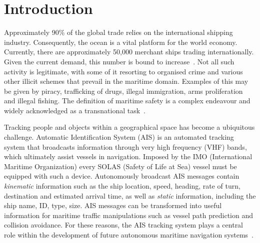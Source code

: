 \chapter{Introduction}
\label{chapter:introduction}


Approximately 90\% of the global trade relies on the international shipping industry. Consequently, the ocean is a vital platform for the world economy.
Currently, there are approximately 50,000 merchant ships trading internationally. Given the current demand, this number is bound to increase~\cite{ICS}. Not all such activity is legitimate, with some of it resorting to organised crime and various other illicit schemes that prevail in the maritime domain. Examples of this may be given by piracy, trafficking of drugs, illegal immigration, arms proliferation and illegal fishing. The definition of maritime safety is a complex endeavour and widely acknowledged as a transnational task~\cite{Bueger2015}.

Tracking people and objects within a geographical space has become a ubiquitous challenge. Automatic Identification System (AIS)\label{label_AIS} is an automated tracking system that broadcasts information through very high frequency (VHF) bands, which ultimately assist vessels in navigation. Imposed by the IMO (International Maritime Organization)\label{label_IMO} every SOLAS
(Safety of Life at Sea) \label{label_SOLAS} vessel must be equipped with such a device.
Autonomously broadcast AIS messages contain \emph{kinematic} information such as the ship location, speed, heading, rate of turn, destination and estimated arrival time, as well as \emph{static} information, including the ship name, ID, type, size. AIS messages can be transformed into useful information for maritime traffic manipulations such as vessel path prediction and collision avoidance. For these reasons, the AIS tracking system plays a central role within the development of future autonomous maritime navigation systems~\cite{Mao2016}.

